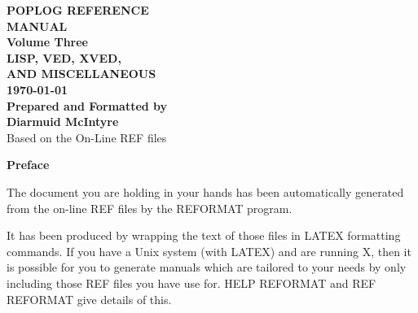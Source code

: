 



\begin{titlepage}
\begin{center}
\rule{0cm}{3cm}
{\Huge\bf POPLOG REFERENCE \\
\vspace{0.5cm}
MANUAL}\\
\vspace{3cm}
{\bf\Large
Volume Three }\\
\vspace{1cm}
{\LARGE\bf LISP, VED, XVED,\\ AND MISCELLANEOUS}\\
\vspace{1cm}
{\bf\Large \today }\\
\vspace{9cm}
{\LARGE\bf Prepared and Formatted by \\ Diarmuid McIntyre}\\
\vspace{1.5cm}
{\Large Based on the On-Line REF files \\}
\end{center}

\end{titlepage}


\rule{0cm}{3cm}
\begin{center}
{\Huge\bf Preface}
\end{center}
\vspace{1cm}

 The document you are holding in your hands has been automatically
generated from the on-line REF files by the REFORMAT program.

It has been produced by wrapping the text of those files in LATEX
formatting commands. If you have a Unix system (with LATEX) and are
running X, then it is possible for you to generate manuals which are
tailored to your needs by only including those REF files you have use
for. HELP REFORMAT and REF REFORMAT give details of this.


